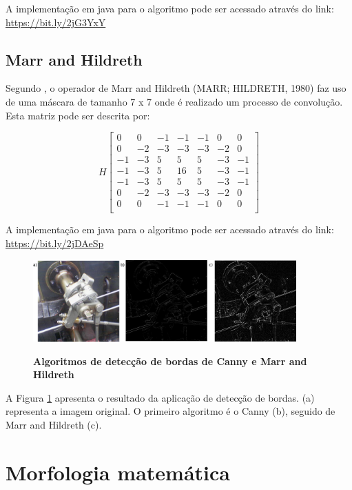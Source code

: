 \documentclass[
	12pt,				%
	oneside,			%
	a4paper,			%
	english,			%
	french,				%
	spanish,			%
	brazil,				%
	]{abntex2}
\begin{document}
A implementação em java para o algoritmo pode ser acessado através do link: \url{https://bit.ly/2jG3YxY}

\subsection{Marr and Hildreth}
Segundo \citet{pedriniSchwartz:2008}, o operador de Marr and Hildreth (MARR; HILDRETH, 1980) faz uso de uma máscara de tamanho 7 x 7 onde é realizado um processo de convolução. Esta matriz pode ser descrita por:

\[
H 
\begin{bmatrix}
     0 &  0 & -1 & -1 & -1 &  0 &  0            \\ 
     0 & -2 & -3 & -3 & -3 & -2 &  0            \\ 
    -1 & -3 &  5 &  5 &  5 & -3 & -1            \\ 
    -1 & -3 &  5 & 16 &  5 & -3 & -1            \\ 
    -1 & -3 &  5 &  5 &  5 & -3 & -1            \\ 
     0 & -2 & -3 & -3 & -3 & -2 &  0            \\ 
     0 &  0 & -1 & -1 & -1 &  0 &  0            \\ 
\end{bmatrix} 
\]

A implementação em java para o algoritmo pode ser acessado através do link: \url{https://bit.ly/2jDAeSp}

\begin{figure}[ht]
\centering
\caption{\textbf{Algoritmos de detecção de bordas de Canny e Marr and Hildreth}}
\includegraphics[width=0.9\textwidth]{imagens/deteccao_bordas2.png}
\sourceAuthor
\label{fig:deteccao_bordas2}
\end{figure}

A Figura \ref{fig:deteccao_bordas2} apresenta o resultado da aplicação de detecção de bordas. (a) representa a imagem original. O primeiro algoritmo é o Canny (b), seguido de Marr and Hildreth (c).

\section{Morfologia matemática}
\end{document}
